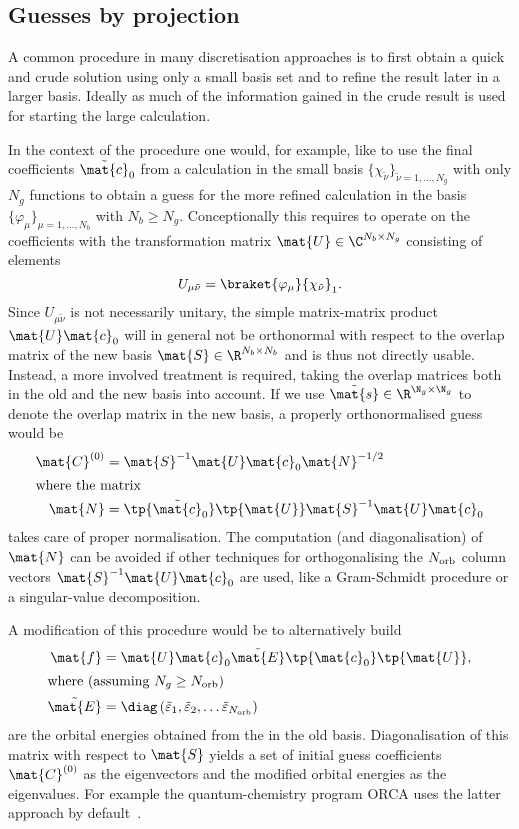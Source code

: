 \subsection{Guesses by projection}
\label{sec:GuessProject}
A common procedure in many discretisation approaches
is to first obtain a quick and crude solution
using only a small basis set and to refine the result later in a larger basis.
Ideally as much of the information gained in the crude result
is used for starting the large calculation.

In the context of the \SCF procedure one would, for example,
like to use the final coefficients $\tilde{\mat{c}}_0$ from a calculation
in the small basis $\{\chi_{\tilde{\nu}}\}_{\tilde{\nu}=1,\ldots,N_g}$
with only $N_g$ functions
to obtain a guess for the more refined calculation in the basis
$\{\varphi_\mu\}_{\mu=1,\ldots,N_b}$ with $N_b \geq N_g$.
Conceptionally this requires to operate on the coefficients
with the transformation matrix
$\mat{U} \in \C^{N_b\times N_g}$
consisting of elements
\[ U_{\mu\tilde{\nu}} = \braket{\varphi_\mu}{\chi_{\tilde{\nu}}}_1. \]
Since $U_{\mu\tilde{\nu}}$ is not necessarily unitary,
the simple matrix-matrix product $\mat{U} \mat{c}_0$
will in general not be orthonormal
with respect to the overlap matrix of the new basis $\mat{S} \in \R^{N_b \times N_b}$
and is thus not directly usable.
Instead, a more involved treatment is required,
taking the overlap matrices both in the old and the new basis into account.
If we use $\tilde{\mat{s}} \in \R^{\N_g \times \N_g}$
to denote the overlap matrix in the new basis,
a properly orthonormalised guess would be~\cite{Polly2004}
\begin{align}
	\mat{C}^{(0)} &= \mat{S}^{-1} \mat{U} \mat{c}_0 \mat{N}^{-1/2} \\
	\intertext{where the matrix}
	\mat{N} &= \tp{\tilde{\mat{c}}_0} \tp{\mat{U}} \mat{S}^{-1} \mat{U} \mat{c}_0
\end{align}
takes care of proper normalisation.
The computation (and diagonalisation) of $\mat{N}$
can be avoided if other techniques
for orthogonalising the $N_\text{orb}$ column vectors $\mat{S}^{-1} \mat{U} \mat{c}_0$
are used, like a Gram-Schmidt procedure or a singular-value decomposition.

A modification of this procedure would be to alternatively build
\begin{align}
	\label{eqn:GuessMatF}
	\mat{f} &= \mat{U} \mat{c}_0 \tilde{\mat{E}} \tp{\mat{c}_0} \tp{\mat{U}}, \\
	\intertext{where (assuming $N_g \geq \Norb$)}
	\nonumber
	\tilde{\mat{E}} &= \diag\left(\tilde{\varepsilon}_1, \tilde{\varepsilon}_2,
			\ldots \tilde{\varepsilon}_{\Norb}\right)
\end{align}
are the orbital energies obtained from the \SCF in the old basis.
Diagonalisation of this matrix with respect to $\mat{S}$
yields a set of initial guess coefficients $\mat{C}^{(0)}$ as the eigenvectors
and the modified orbital energies as the eigenvalues.
For example the quantum-chemistry program ORCA uses the latter
approach by default~\cite{ORCA}.

